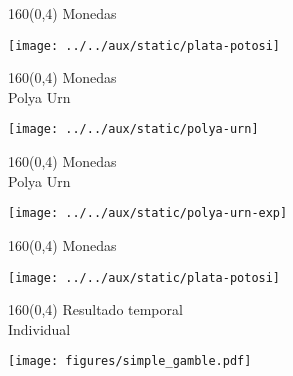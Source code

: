 \documentclass[shownotes,aspectratio=169]{beamer}
\begin{document}
\begin{frame}[plain]
 \begin{textblock}{160}(0,4)
  \centering \LARGE Monedas
 \end{textblock}

\vspace{1cm}

\texttt{[image: ../../aux/static/plata-potosi]}
 
\end{frame}


\begin{frame}[plain]
 \begin{textblock}{160}(0,4)
  \centering \LARGE Monedas \\ \normalsize Polya Urn
 \end{textblock}

 \vspace{1cm}
\centering
\texttt{[image: ../../aux/static/polya-urn]}

 \end{frame}


 \begin{frame}[plain]
 \begin{textblock}{160}(0,4)
  \centering \LARGE Monedas \\ \normalsize Polya Urn
 \end{textblock}

 \vspace{1cm}
\centering
\texttt{[image: ../../aux/static/polya-urn-exp]}
 
 \end{frame}

 \begin{frame}[plain]
 \begin{textblock}{160}(0,4)
  \centering \LARGE Monedas
 \end{textblock}

\vspace{1cm}

\texttt{[image: ../../aux/static/plata-potosi]}
 
\end{frame}
 
 
\begin{frame}[plain]
 \begin{textblock}{160}(0,4)
  \centering \Large Resultado temporal \\ \normalsize Individual
 \end{textblock}
 

 \centering
\vspace{1cm}
 
\texttt{[image: figures/simple\_gamble.pdf]}

\end{frame}
\end{document}
